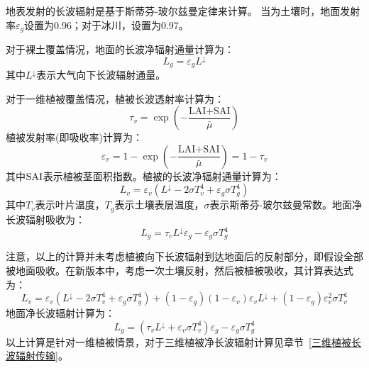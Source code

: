 地表发射的长波辐射是基于斯蒂芬-玻尔兹曼定律来计算。
当为土壤时，地面发射率$\varepsilon_g$设置为0.96；对于冰川，设置为0.97。

对于裸土覆盖情况，地面的长波净辐射通量计算为：
\begin{equation}
L_{g}=\varepsilon_{g} L ^\downarrow
\end{equation}
其中$L ^\downarrow$表示大气向下长波辐射通量。

对于一维植被覆盖情况，植被长波透射率计算为：
\begin{equation}
\tau_{v}=\exp \left(-\frac{\text{LAI+SAI}}{\bar{\mu}}\right)
\end{equation}
植被发射率(即吸收率)计算为：
\begin{equation}
\varepsilon_{v}=1-\exp \left(-\frac{\text{LAI+SAI}}{\bar{\mu}}\right)=1-\tau _v
\end{equation}
其中$\rm SAI$表示植被茎面积指数。植被的长波净辐射通量计算为：
\begin{equation}
L_{v}=\varepsilon_{v}\left(L ^\downarrow-2 \sigma T_{v}^{4}+\varepsilon_{g} \sigma T_{g}^{4}\right)
\end{equation}
其中$T_v$表示叶片温度，$T_g$表示土壤表层温度，$\sigma$表示斯蒂芬-玻尔兹曼常数。地面净长波辐射吸收为：
\begin{equation}\label{eq:lg1}
L_g= \tau_{v} L ^\downarrow \varepsilon_g - \varepsilon_{g} \sigma T_{g}^{4}
\end{equation}

注意，以上的计算并未考虑植被向下长波辐射到达地面后的反射部分，即假设全部被地面吸收。在新版本中，考虑一次土壤反射，然后被植被吸收，其计算表达式为：
\begin{equation}
L_{v}=\varepsilon_{v}\left(L ^\downarrow-2 \sigma T_{v}^{4}+\varepsilon_{g} \sigma T_{g}^{4}\right)+\left(1-\varepsilon_{g}\right)\left(1-\varepsilon_{v}\right) \varepsilon_{v} L ^\downarrow+\left(1-\varepsilon_{g}\right) \varepsilon_{v}^{2} \sigma T_{v}^{4}
\end{equation}
地面净长波辐射计算为：
\begin{equation}\label{eq:lg2}
L_{g}=\left(\tau_{v} L ^\downarrow  + \varepsilon_{v} \sigma T_{v}^{4} \right) \varepsilon_{g} - \varepsilon_{g} \sigma T_{g}^{4}
\end{equation}
以上计算是针对一维植被情景，对于三维植被净长波辐射计算见章节~\ref{三维植被长波辐射传输}。
